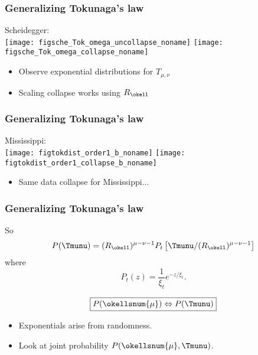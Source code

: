 \begin{frame}[label=]
  \frametitle{Generalizing Tokunaga's law}
  
  Scheidegger:\\
  \texttt{[image: figsche\_Tok\_omega\_uncollapse\_noname]}
  \texttt{[image: figsche\_Tok\_omega\_collapse\_noname]} 

  \begin{itemize}
  \item Observe exponential distributions for $T_{\mu,\nu}$
  \item Scaling collapse works using $R_\okell$
  \end{itemize}

\end{frame}

\begin{frame}[label=]
  \frametitle{Generalizing Tokunaga's law}
  
  Mississippi:\\
  \texttt{[image: figtokdist\_order1\_b\_noname]} 
  \texttt{[image: figtokdist\_order1\_collapse\_b\_noname]}

  \begin{itemize}
  \item Same data collapse for Mississippi...
  \end{itemize}

\end{frame}

\begin{frame}[label=]
  \frametitle{Generalizing Tokunaga's law}

  So
  \[
  P(\Tmunu) = (R_\okell)^{\mu-\nu-1}
  P_t\left[ \Tmunu / (R_\okell)^{\mu-\nu-1}  \right]
  \]
  where
  \[
  P_t(z) = \frac{1}{\xi_t} e^{-z/\xi_t}.
  \]

  \[ \boxed{P(\okellsnum{\mu}) \Leftrightarrow P(\Tmunu)} \]

  \begin{itemize}
  \item Exponentials arise from randomness.
  \item Look at joint probability $P(\okellsnum{\mu},\Tmunu)$.
  \end{itemize}

\end{frame}

